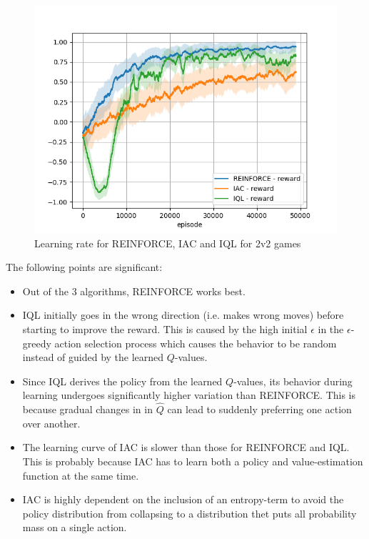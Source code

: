 \begin{figure}[htp]
    \centering
    \includegraphics[width=14cm]{images/experiment4/compare_reward.png}
    \caption{Learning rate for REINFORCE, IAC and IQL for 2v2 games}
    \label{fig:compare_reward}
\end{figure}

The following points are significant:
\begin{itemize}
    \item Out of the 3 algorithms, REINFORCE works best.
    \item IQL initially goes in the wrong direction (i.e. makes wrong moves) before starting to improve the reward. This is caused by the high initial $\epsilon$ in the $\epsilon$-greedy action selection process which causes the behavior to be random instead of guided by the learned $Q$-values.
    \item Since IQL derives the policy from the learned $Q$-values, its behavior during learning undergoes significantly higher variation than REINFORCE. This is because gradual changes in in $\hat Q$ can lead to suddenly preferring one action over another.
    \item The learning curve of IAC is slower than those for REINFORCE and IQL. This is probably because IAC has to learn both a policy and value-estimation function at the same time.
    \item IAC is highly dependent on the inclusion of an entropy-term to avoid the policy distribution from collapsing to a distribution thet puts all probability mass on a single action.
\end{itemize}

